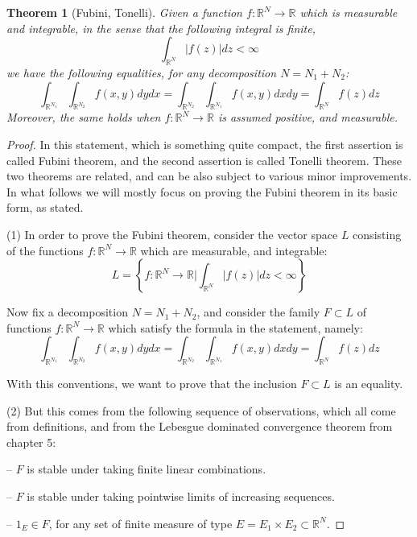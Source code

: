 \documentclass[12pt]{amsbook}
\newtheorem{theorem}{Theorem}[chapter]
\begin{document}
\begin{theorem}[Fubini, Tonelli]
Given a function $f:\mathbb R^N\to\mathbb R$ which is measurable and integrable, in the sense that the following integral is finite,
$$\int_{\mathbb R^N}|f(z)|dz<\infty$$
we have the following equalities, for any decomposition $N=N_1+N_2$:
$$\int_{\mathbb R^{N_1}}\int_{\mathbb R^{N_2}}f(x,y)dydx=\int_{\mathbb R^{N_2}}\int_{\mathbb R^{N_1}}f(x,y)dxdy=\int_{\mathbb R^N}f(z)dz$$
Moreover, the same holds when $f:\mathbb R^N\to\mathbb R$ is assumed positive, and measurable. 
\end{theorem}

\begin{proof}
In this statement, which is something quite compact, the first assertion is called Fubini theorem, and the second assertion is called Tonelli theorem. These two theorems are related, and can be also subject to various minor improvements. In what follows we will mostly focus on proving the Fubini theorem in its basic form, as stated.

\medskip

(1) In order to prove the Fubini theorem, consider the vector space $L$ consisting of the functions $f:\mathbb R^N\to\mathbb R$ which are measurable, and integrable:
$$L=\left\{f:\mathbb R^N\to\mathbb R\Big|\int_{\mathbb R^N}|f(z)|dz<\infty\right\}$$

Now fix a decomposition $N=N_1+N_2$, and consider the family $F\subset L$ of functions $f:\mathbb R^N\to\mathbb R$ which satisfy the formula in the statement, namely:
$$\int_{\mathbb R^{N_1}}\int_{\mathbb R^{N_2}}f(x,y)dydx=\int_{\mathbb R^{N_2}}\int_{\mathbb R^{N_1}}f(x,y)dxdy=\int_{\mathbb R^N}f(z)dz$$

With this conventions, we want to prove that the inclusion $F\subset L$ is an equality.

\medskip

(2) But this comes from the following sequence of observations, which all come from definitions, and from the Lebesgue dominated convergence theorem from chapter 5:

\medskip

-- $F$ is stable under taking finite linear combinations.

\medskip

-- $F$ is stable under taking pointwise limits of increasing sequences.

\medskip

-- $1_E\in F$, for any set of finite measure of type $E=E_1\times E_2\subset\mathbb R^N$.


\end{proof}
\end{document}
